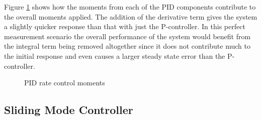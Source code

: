 Figure \ref{fig:PIDRateControlMoments} shows how the moments from each of the PID components contribute to the overall moments applied.  The addition of the derivative term gives the system a slightly quicker response than that with just the P-controller.   In this perfect measurement scenario the overall performance of the system would benefit from the integral term being removed altogether since it does not contribute much to the initial response and even causes a larger steady state error than the P-controller.
\begin{figure}[H]
  \centerline{}
  \caption{PID rate control moments}
  \label{fig:PIDRateControlMoments}
\end{figure}

\subsection{Sliding Mode Controller}
\label{subsec:SlidingModeController}

